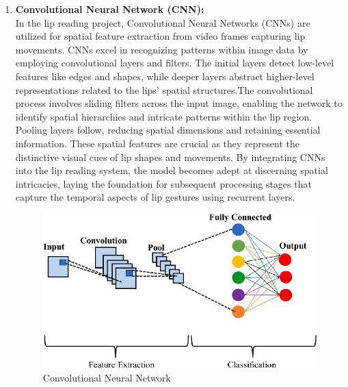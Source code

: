 \begin{enumerate}
\begin{figure}[h]
	\end{figure}
	\pagebreak
	\item \textbf{Convolutional Neural Network (CNN):}
	\\In the lip reading project, Convolutional Neural Networks (CNNs) are utilized for spatial feature extraction from video frames capturing lip movements. CNNs excel in recognizing patterns within image data by employing convolutional layers and filters. The initial layers detect low-level features like edges and shapes, while deeper layers abstract higher-level representations related to the lips' spatial structures.The convolutional process involves sliding filters across the input image, enabling the network to identify spatial hierarchies and intricate patterns within the lip region. Pooling layers follow, reducing spatial dimensions and retaining essential information. These spatial features are crucial as they represent the distinctive visual cues of lip shapes and movements. By integrating CNNs into the lip reading system, the model becomes adept at discerning spatial intricacies, laying the foundation for subsequent processing stages that capture the temporal aspects of lip gestures using recurrent layers.
	
	
	\begin{figure}[h]
	\centering
	\includegraphics[scale=1.1]{images/CNN.png}
	\caption{Convolutional Neural Network}
	

\end{figure}
\end{enumerate}
